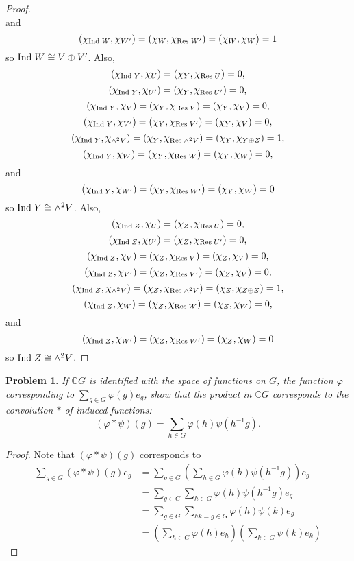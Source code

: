\documentclass{article}
\newcommand{\ind}{\textup{Ind}\;}
\newcommand{\res}{\textup{Res}\;}
\newtheorem{problem}{Problem}
\begin{document}
\begin{proof}
\[\]
and
\[
(\chi_{\ind W}, \chi_{W'}) = (\chi_W, \chi_{\res W'}) = (\chi_W, \chi_W) = 1
\]
so $\ind W \cong V \oplus V'$. Also,
\[
(\chi_{\ind Y}, \chi_U) = (\chi_Y, \chi_{\res U}) = 0,
\]
\[
(\chi_{\ind Y}, \chi_{U'}) = (\chi_Y, \chi_{\res U'}) = 0,
\]
\[
(\chi_{\ind Y}, \chi_V) = (\chi_Y, \chi_{\res V}) = (\chi_Y, \chi_V) = 0,
\]
\[
(\chi_{\ind Y}, \chi_{V'}) = (\chi_Y, \chi_{\res V'}) = (\chi_Y, \chi_V) = 0,
\]
\[
(\chi_{\ind Y}, \chi_{\wedge^2 V}) = (\chi_Y, \chi_{\res \wedge^2 V}) = (\chi_Y, \chi_{Y \oplus Z}) = 1,
\]
\[
(\chi_{\ind Y}, \chi_W) = (\chi_Y, \chi_{\res W}) = (\chi_Y, \chi_W) = 0,
\]
and
\[
(\chi_{\ind Y}, \chi_{W'}) = (\chi_Y, \chi_{\res W'}) = (\chi_Y, \chi_W) = 0
\]
so $\ind Y \cong \wedge^2 V$. Also,
\[
(\chi_{\ind Z}, \chi_U) = (\chi_Z, \chi_{\res U}) = 0,
\]
\[
(\chi_{\ind Z}, \chi_{U'}) = (\chi_Z, \chi_{\res U'}) = 0,
\]
\[
(\chi_{\ind Z}, \chi_V) = (\chi_Z, \chi_{\res V}) = (\chi_Z, \chi_V) = 0,
\]
\[
(\chi_{\ind Z}, \chi_{V'}) = (\chi_Z, \chi_{\res V'}) = (\chi_Z, \chi_V) = 0,
\]
\[
(\chi_{\ind Z}, \chi_{\wedge^2 V}) = (\chi_Z, \chi_{\res \wedge^2 V}) = (\chi_Z, \chi_{Z \oplus Z}) = 1,
\]
\[
(\chi_{\ind Z}, \chi_W) = (\chi_Z, \chi_{\res W}) = (\chi_Z, \chi_W) = 0,
\]
and
\[
(\chi_{\ind Z}, \chi_{W'}) = (\chi_Z, \chi_{\res W'}) = (\chi_Z, \chi_W) = 0
\]
so $\ind Z \cong \wedge^2 V$.
\end{proof}

\begin{problem}
If $\mathbb{C}G$ is identified with the space of functions on $G$, the function $\varphi$ corresponding to $\sum_{g \in G} \varphi(g) e_g$, show that the product in $\mathbb{C}G$ corresponds to the convolution $*$ of induced functions:
\[
(\varphi * \psi)(g)  = \sum_{h \in G} \varphi(h) \psi(h^{-1}g).
\]
\end{problem}
\begin{proof}
Note that $(\varphi * \psi)(g)$ corresponds to
\begin{align*}
\sum_{g \in G} (\varphi * \psi)(g)e_g
&=\sum_{g \in G} \left ( \sum_{h \in G} \varphi(h) \psi(h^{-1}g) \right ) e_g\\
&= \sum_{g \in G} \sum_{h \in G} \varphi(h) \psi(h^{-1}g) e_g\\
&= \sum_{g \in G} \sum_{hk = g \in G} \varphi(h) \psi(k) e_g\\
&= \left ( \sum_{h \in G} \varphi(h)e_h \right ) \left ( \sum_{k \in G} \psi(k)e_k \right )
\end{align*}
\end{proof}
\end{document}
